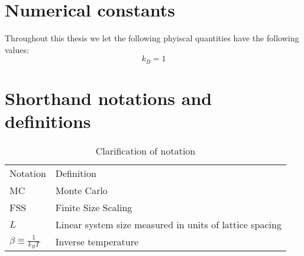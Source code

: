 %
\section{Numerical constants}
Throughout this thesis we let the following phyiscal quantities have the following values:
\begin{equation}
  k_B = 1
  \label{}
\end{equation}

\section{Shorthand notations and definitions}
\begin{table}[htpb]
  \begin{center}
    \begin{tabular}{l l}
      Notation & Definition\\
      MC & Monte Carlo\\
      FSS & Finite Size Scaling\\
      $L$ & Linear system size measured in units of lattice spacing\\
      $\beta \equiv \frac{1}{k_B T}$ & Inverse temperature\\
    \end{tabular}
  \end{center}
  \caption{Clarification of notation}
\end{table}


